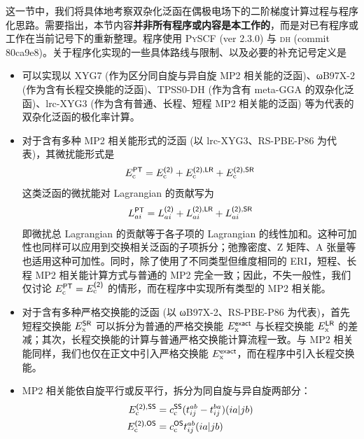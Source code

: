 这一节中，我们将具体地考察双杂化泛函在偶极电场下的二阶梯度计算过程与程序化思路。需要指出，本节内容\textbf{并非所有程序或内容是本工作的}，而是对已有程序或工作在当前记号下的重新整理。程序使用 \textsc{PySCF} (ver 2.3.0) 与 \textsc{dh} (commit 80ca9e8)。关于程序化实现的一些具体路线与限制、以及必要的补充记号定义是
\begin{itemize}[nosep]
    \item 可以实现以 XYG7 (作为区分同自旋与异自旋 MP2 相关能的泛函)、ωB97X-2 (作为含有长程交换能的泛函)、TPSS0-DH (作为含有 meta-GGA 的双杂化泛函)、lrc-XYG3 (作为含有普通、长程、短程 MP2 相关能的泛函) 等为代表的双杂化泛函的极化率计算。
    \item 对于含有多种 MP2 相关能形式的泛函 (以 lrc-XYG3、RS-PBE-P86 为代表)，其微扰能形式是
        \begin{equation*}
          E_\mathrm{c}^{\textsf{PT}} = E_\mathrm{c}^{\textsf{(2)}} + E_\mathrm{c}^{\textsf{(2)}, \textsf{LR}} + E_\mathrm{c}^{\textsf{(2)}, \textsf{SR}}
        \end{equation*}
        这类泛函的微扰能对 Lagrangian 的贡献写为
        \begin{equation*}
          L_{ai}^{\textsf{PT}} = L_{ai}^{\textsf{(2)}} + L_{ai}^{\textsf{(2)}, \textsf{LR}} + L_{ai}^{\textsf{(2)}, \textsf{SR}}
        \end{equation*}
        即微扰总 Lagrangian 的贡献等于各子项的 Lagrangian 的线性加和。这种可加性也同样可以应用到交换相关泛函的子项拆分；弛豫密度、Z 矩阵、A 张量等也适用这种可加性。同时，除了使用了不同类型但维度相同的 ERI，短程、长程 MP2 相关能计算方式与普通的 MP2 完全一致；因此，不失一般性，我们仅讨论 $E_\mathrm{c}^{\textsf{PT}} = E_\mathrm{c}^{\textsf{(2)}}$ 的情形，而在程序中实现所有类型的 MP2 相关能。
    \item 对于含有多种严格交换能的泛函 (以 ωB97X-2、RS-PBE-P86 为代表)，首先短程交换能 $E_\mathrm{x}^{\textsf{SR}}$ 可以拆分为普通的严格交换能 $E_\mathrm{x}^{\textsf{exact}}$ 与长程交换能 $E_\mathrm{x}^{\textsf{LR}}$ 的差减；其次，长程交换能的计算与普通严格交换能计算流程一致。与 MP2 相关能同样，我们也仅在正文中引入严格交换能 $E_\mathrm{x}^{\textsf{exact}}$，而在程序中引入长程交换能。
    \item MP2 相关能依自旋平行或反平行，拆分为同自旋与异自旋两部分：
        \begin{align}
          E_\mathrm{c}^{\textmt{(2)}, \textmt{SS}} &= c_\mathrm{c}^\textmt{SS} (t_{ij}^{ab} - t_{ij}^{ba}) (ia|jb) \\
          E_\mathrm{c}^{\textmt{(2)}, \textmt{OS}} &= c_\mathrm{c}^\textmt{OS} t_{ij}^{ab} (ia|jb) 

\end{align}
\end{itemize}
